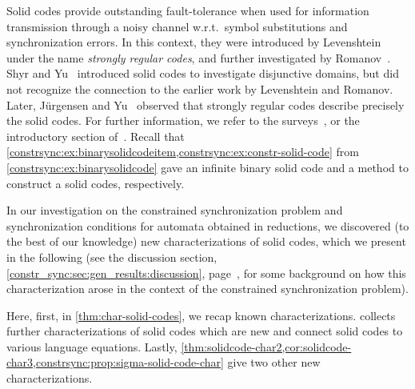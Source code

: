  
Solid codes provide outstanding fault-tolerance when used for information transmission through a noisy channel w.r.t.~symbol substitutions and synchronization errors. In this context,
they were introduced by Levenshtein~\cite{Lev64} under the name \emph{strongly regular codes}, 
and further investigated by Romanov~\cite{Rom66}.
Shyr and Yu~\cite{ShyrYu90} introduced solid codes to investigate disjunctive domains, 
but did not recognize the connection to the earlier work by Levenshtein and Romanov. 
Later, Jürgensen and Yu~\cite{DBLP:journals/eik/JurgensenY90} observed that strongly 
regular codes describe precisely the solid codes.
For further information, we refer to the surveys~\cite{DBLP:journals/iandc/Jurgensen08,DBLP:reference/hfl/JurgensenK97},
or the introductory section of~\cite{DBLP:journals/tcs/JurgensenS21}. 
Recall that \cref{constrsync:ex:binarysolidcodeitem,constrsync:ex:constr-solid-code}
from \cref{constrsync:ex:binarysolidcode} gave an infinite binary solid code 
and a method to construct a solid codes, respectively.

In our investigation on the constrained synchronization problem and synchronization conditions
for automata obtained in reductions, we discovered (to the best of our knowledge)
new characterizations of solid codes, which we present in the following
(see the discussion section,
\cref{constr_sync:sec:gen_results:discussion}, page~\pageref{discussion:strongly-self-sync-codes}, 
for some background on how this characterization arose in the context
of the constrained synchronization problem).

Here, first, in \cref{thm:char-solid-codes}, we recap known characterizations. 
 collects further characterizations of solid codes
which are new and connect solid codes to various language equations.
Lastly, \cref{thm:solidcode-char2,cor:solidcode-char3,constrsync:prop:sigma-solid-code-char} 
give two other new characterizations.


